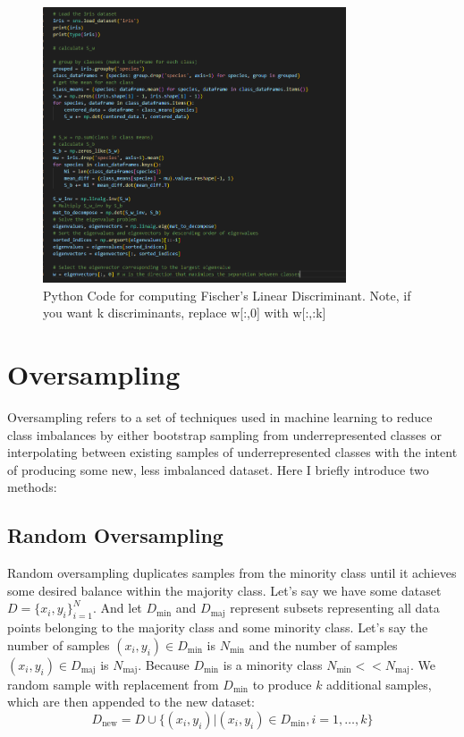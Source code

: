 \documentclass[12pt]{article}
\begin{document}
\begin{figure}[H]
    \centering
    \includegraphics[width=0.8\textwidth]{./FLD_calculation.png} %
    \caption{Python Code for computing Fischer's Linear Discriminant. Note, if you want k discriminants, replace w[:,0] with w[:,:k]}
\end{figure}
\section{Oversampling}
Oversampling refers to a set of techniques used in machine learning to reduce class imbalances by either bootstrap sampling from underrepresented classes or interpolating between existing samples of underrepresented classes with the intent of producing some new, less imbalanced dataset. Here I briefly introduce two methods:

\subsection{Random Oversampling}
Random oversampling duplicates samples from the minority class until it achieves some desired balance within the majority class. Let's say we have some dataset \(D = \{x_i, y_i\}_{i=1}^N\). And let \(D_\text{min}\) and \(D_\text{maj}\) represent subsets representing all data points belonging to the majority class and some minority class. Let's say the number of samples \((x_i, y_i) \in D_\text{min}\) is \(N_\text{min}\) and the number of samples \((x_i, y_i) \in D_\text{maj}\) is \(N_\text{maj}\). Because  \(D_\text{min}\) is a minority class \(N_\text{min} << N_\text{maj}\). We random sample with replacement from \(D_\text{min}\) to produce \(k\) additional samples, which are then appended to the new dataset:
\[D_\text{new} = D \cup \{(x_i, y_i) | (x_i, y_i) \in D_\text{min}, i=1, \ldots, k\}\]
\end{document}
